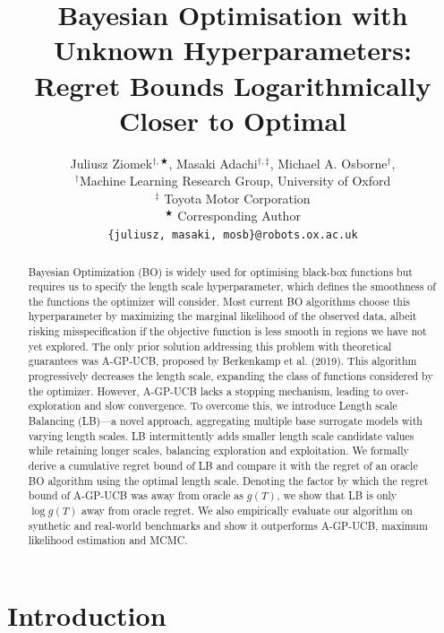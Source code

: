\documentclass{article}
\title{Bayesian Optimisation with \\ Unknown Hyperparameters:\\ Regret Bounds Logarithmically Closer to Optimal}
\author{
    Juliusz Ziomek$^{\dagger, \bigstar}$, 
    Masaki Adachi$^{\dagger, \ddagger}$, 
    Michael A. Osborne$^{\dagger}$,\\
    \small{$^\dagger$Machine Learning Research Group, University of Oxford}\\
    \small{$^\ddagger$ Toyota Motor Corporation}\\
    \small{$^\bigstar$ Corresponding Author} \\
    \small{\texttt{\{juliusz, masaki, mosb\}@robots.ox.ac.uk}}\\
}
\theoremstyle{plain}
\theoremstyle{definition}
\theoremstyle{remark}
\theoremstyle{plain}
\begin{document}
\maketitle


\begin{abstract}
 Bayesian Optimization (BO) is widely used for optimising black-box functions but requires us to specify the length scale hyperparameter, which defines the smoothness of the functions the optimizer will consider. Most current BO algorithms choose this hyperparameter by maximizing the marginal likelihood of the observed data, albeit risking misspecification if the objective function is less smooth in regions we have not yet explored. The only prior solution addressing this problem with theoretical guarantees was A-GP-UCB, proposed by Berkenkamp et al. (2019). This algorithm progressively decreases the length scale, expanding the class of functions considered by the optimizer. However, A-GP-UCB lacks a stopping mechanism, leading to over-exploration and slow convergence. To overcome this, we introduce Length scale Balancing (LB)---a novel approach, aggregating multiple base surrogate models with varying length scales. LB intermittently adds smaller length scale candidate values while retaining longer scales, balancing exploration and exploitation. We formally derive a cumulative regret bound of LB and compare it with the regret of an oracle BO algorithm using the optimal length scale. Denoting the factor by which the regret bound of A-GP-UCB was away from oracle as $g(T)$,  we show that LB is only $\log g(T)$ away from oracle regret. We also empirically evaluate our algorithm on synthetic and real-world benchmarks and show it outperforms A-GP-UCB, maximum likelihood estimation and MCMC.
\end{abstract}

\section{Introduction}
\end{document}
